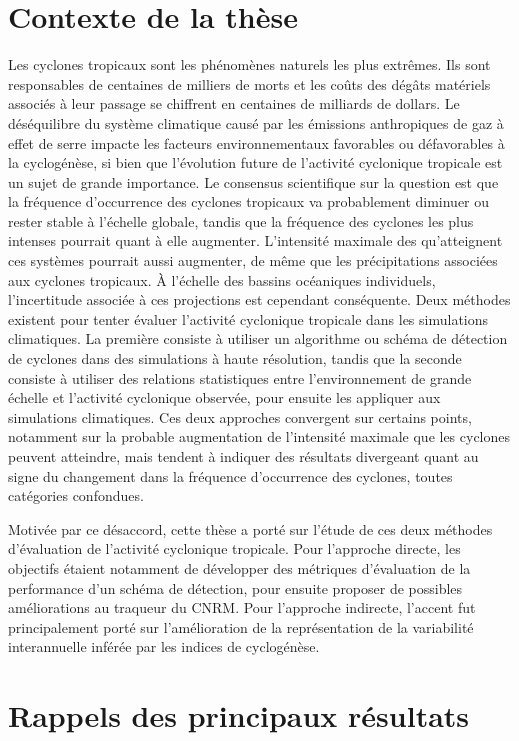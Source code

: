 \documentclass[../main.tex]{subfiles}
\begin{document}
\section*{Contexte de la thèse}

Les cyclones tropicaux sont les phénomènes naturels les plus extrêmes. Ils sont responsables de centaines de milliers de morts et les coûts des dégâts matériels
associés à leur passage se chiffrent en centaines de milliards de dollars. Le déséquilibre du système climatique causé par les émissions anthropiques de gaz à
effet de serre impacte les facteurs environnementaux favorables ou défavorables à la cyclogénèse, si bien que l'évolution future de l'activité cyclonique
tropicale est un sujet de grande importance. Le consensus scientifique sur la question est que la fréquence d'occurrence des cyclones tropicaux va probablement
diminuer ou rester stable à l'échelle globale, tandis que la fréquence des cyclones les plus intenses pourrait quant à elle augmenter. L'intensité maximale des
qu'atteignent ces systèmes pourrait aussi augmenter, de même que les précipitations associées aux cyclones tropicaux. À l'échelle des bassins océaniques
individuels, l'incertitude associée à ces projections est cependant conséquente. Deux méthodes existent pour tenter évaluer l'activité cyclonique tropicale dans
les simulations climatiques. La première consiste à utiliser un algorithme ou schéma de détection de cyclones dans des simulations à haute résolution, tandis
que la seconde consiste à utiliser des relations statistiques entre l'environnement de grande échelle et l'activité cyclonique observée, pour ensuite les
appliquer aux simulations climatiques. Ces deux approches convergent sur certains points, notamment sur la probable augmentation de l'intensité maximale que les
cyclones peuvent atteindre, mais tendent à indiquer des résultats divergeant quant au signe du changement dans la fréquence d'occurrence des cyclones, toutes
catégories confondues.

Motivée par ce désaccord, cette thèse a porté sur l'étude de ces deux méthodes d'évaluation de l'activité cyclonique tropicale. Pour l'approche directe, les
objectifs étaient notamment de développer des métriques d'évaluation de la performance d'un schéma de détection, pour ensuite proposer de possibles
améliorations au traqueur du CNRM. Pour l'approche indirecte, l'accent fut principalement porté sur l'amélioration de la représentation de la variabilité
interannuelle inférée par les indices de cyclogénèse.

\section*{Rappels des principaux résultats}
\end{document}
